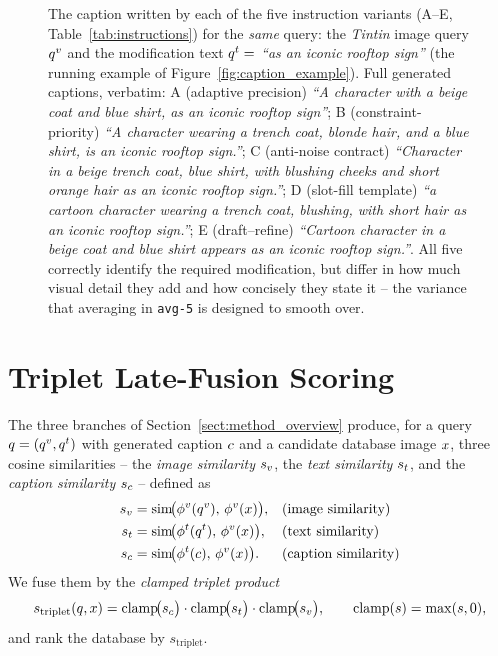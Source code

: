 \begin{figure}[H]
\centering
\resizebox{\textwidth}{!}{}
\caption[Generated captions across the five instruction variants.]{The
caption written by each of the five instruction variants (\textsc{A}--\textsc{E},
Table~\ref{tab:instructions}) for the \emph{same} query: the \emph{Tintin}
image query $\qv$ and the modification text $\qt =$ \emph{``as an iconic
rooftop sign''} (the running example of Figure~\ref{fig:caption_example}).
Full generated captions, verbatim: \textsc{A} (adaptive precision)
\emph{``A character with a beige coat and blue shirt, as an iconic rooftop
sign''}; \textsc{B} (constraint-priority) \emph{``A character wearing a
trench coat, blonde hair, and a blue shirt, is an iconic rooftop sign.''};
\textsc{C} (anti-noise contract) \emph{``Character in a beige trench coat,
blue shirt, with blushing cheeks and short orange hair as an iconic rooftop
sign.''}; \textsc{D} (slot-fill template) \emph{``a cartoon character wearing
a trench coat, blushing, with short hair as an iconic rooftop sign.''};
\textsc{E} (draft--refine) \emph{``Cartoon character in a beige coat and blue
shirt appears as an iconic rooftop sign.''}. All five correctly identify the
required modification, but differ in how much visual detail they add and how
concisely they state it -- the variance that averaging in
\texttt{avg-5} is designed to smooth
over.\label{fig:instruction_captions}}
\end{figure}

\section{Triplet Late-Fusion Scoring}\label{sect:method_fusion}

The three branches of Section~\ref{sect:method_overview} produce, for a query
$q = (\qv, \qt)$ with generated caption $\qc$ and a candidate database image
$\xdb$, three cosine similarities -- the \emph{image similarity} $\sv$, the
\emph{text similarity} $\st$, and the \emph{caption similarity} $\sc$ --
defined as
\begin{align}
  \sv &= \simop\!\big(\encv(\qv),\, \encv(\xdb)\big),
        && \text{(image similarity)} \label{eq:s_img}\\
  \st &= \simop\!\big(\enct(\qt),\, \encv(\xdb)\big),
        && \text{(text similarity)} \label{eq:s_txt}\\
  \sc &= \simop\!\big(\enct(\qc),\, \encv(\xdb)\big).
        && \text{(caption similarity)} \label{eq:s_cap}
\end{align}
We fuse them by the \emph{clamped triplet product}
\begin{equation}\label{eq:triplet}
    s_{\text{triplet}}(q, \xdb) =
    \clamp\!\big(\sc\big)\cdot
    \clamp\!\big(\st\big)\cdot
    \clamp\!\big(\sv\big),
    \qquad
    \clamp(s) = \max(s, 0),
\end{equation}
and rank the database by $s_{\text{triplet}}$.


